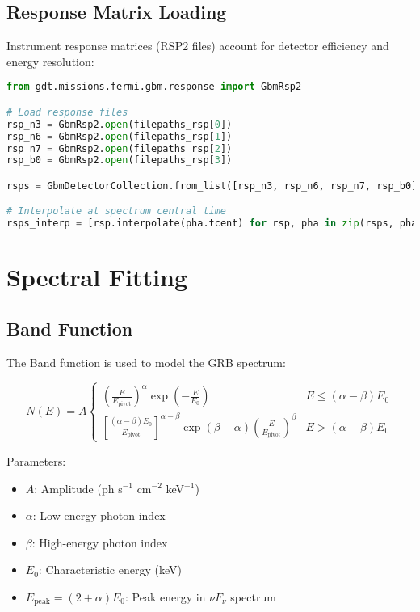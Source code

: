 \documentclass{article}
\begin{document}
\subsection{Response Matrix Loading}

Instrument response matrices (RSP2 files) account for detector efficiency and energy resolution:

\begin{lstlisting}[language=Python]
from gdt.missions.fermi.gbm.response import GbmRsp2

# Load response files
rsp_n3 = GbmRsp2.open(filepaths_rsp[0]) 
rsp_n6 = GbmRsp2.open(filepaths_rsp[1]) 
rsp_n7 = GbmRsp2.open(filepaths_rsp[2])
rsp_b0 = GbmRsp2.open(filepaths_rsp[3])

rsps = GbmDetectorCollection.from_list([rsp_n3, rsp_n6, rsp_n7, rsp_b0])

# Interpolate at spectrum central time
rsps_interp = [rsp.interpolate(pha.tcent) for rsp, pha in zip(rsps, phas)]
\end{lstlisting}

\section{Spectral Fitting}

\subsection{Band Function}

The Band function is used to model the GRB spectrum:

\begin{equation}
N(E) = A \begin{cases}
\left(\frac{E}{E_{\text{pivot}}}\right)^{\alpha} \exp\left(-\frac{E}{E_0}\right) & E \leq (\alpha - \beta) E_0 \\
\left[\frac{(\alpha - \beta) E_0}{E_{\text{pivot}}}\right]^{\alpha - \beta} \exp(\beta - \alpha) \left(\frac{E}{E_{\text{pivot}}}\right)^{\beta} & E > (\alpha - \beta) E_0
\end{cases}
\end{equation}

Parameters:
\begin{itemize}
    \item $A$: Amplitude (ph s$^{-1}$ cm$^{-2}$ keV$^{-1}$)
    \item $\alpha$: Low-energy photon index
    \item $\beta$: High-energy photon index  
    \item $E_0$: Characteristic energy (keV)
    \item $E_{\text{peak}} = (2 + \alpha)E_0$: Peak energy in $\nu F_\nu$ spectrum
\end{itemize}
\end{document}
